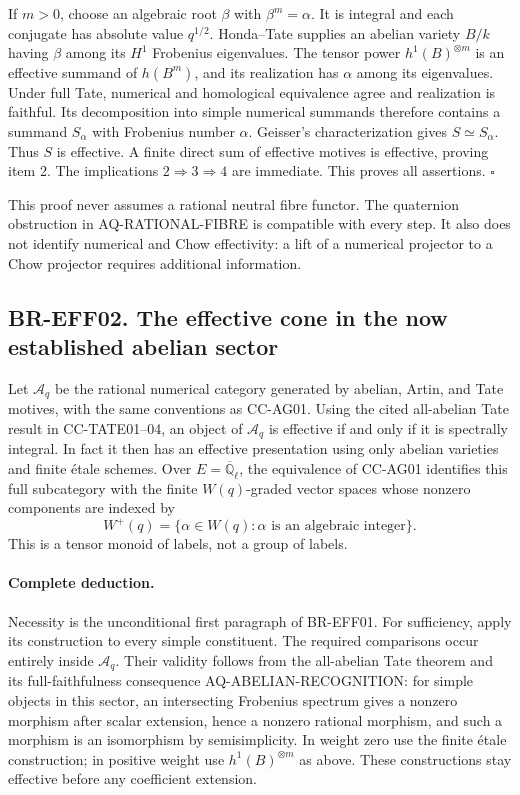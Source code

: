 If $m>0$, choose an algebraic root $\beta$ with $\beta^m=\alpha$.
It is integral and each conjugate has absolute value $q^{1/2}$.
Honda--Tate supplies an abelian variety $B/k$ having $\beta$ among
its $H^1$ Frobenius eigenvalues.  The tensor power
$h^1(B)^{\otimes m}$ is an effective summand of $h(B^m)$, and its
realization has $\alpha$ among its eigenvalues.  Under full Tate,
numerical and homological equivalence agree and realization is
faithful.  Its decomposition into simple numerical summands
therefore contains a summand $S_\alpha$ with Frobenius number
$\alpha$.  Geisser's characterization gives $S\simeq S_\alpha$.
Thus $S$ is effective.  A finite direct sum of effective motives
is effective, proving item 2.  The implications $2\Rightarrow3
\Rightarrow4$ are immediate.  This proves all assertions.
\(\square\)

This proof never assumes a rational neutral fibre functor.
The quaternion obstruction in AQ-RATIONAL-FIBRE is compatible
with every step.  It also does not identify numerical and Chow
effectivity: a lift of a numerical projector to a Chow projector
requires additional information.

\subsection{BR-EFF02. The effective cone in the now established abelian sector}
Let $\mathcal A_q$ be the rational numerical category generated by
abelian, Artin, and Tate motives, with the same conventions as
CC-AG01.  Using the cited all-abelian Tate result in CC-TATE01--04,
an object of $\mathcal A_q$ is effective if and only if it is
spectrally integral.  In fact it then has an effective presentation
using only abelian varieties and finite \'etale schemes.  Over
$E=\overline{\mathbb Q}_\ell$, the equivalence of CC-AG01 identifies
this full subcategory with the finite $W(q)$-graded vector spaces
whose nonzero components are indexed by
\[
 W^+(q)=\{\alpha\in W(q):\alpha\text{ is an algebraic integer}\}.
 \tag{EFF.1}
\]
This is a tensor monoid of labels, not a group of labels.

\paragraph{Complete deduction.}
Necessity is the unconditional first paragraph of BR-EFF01.
For sufficiency, apply its construction to every simple constituent.
The required comparisons occur entirely inside $\mathcal A_q$.
Their validity follows from the all-abelian Tate theorem and its
full-faithfulness consequence AQ-ABELIAN-RECOGNITION: for simple
objects in this sector, an intersecting Frobenius spectrum gives a
nonzero morphism after scalar extension, hence a nonzero rational
morphism, and such a morphism is an isomorphism by semisimplicity.
In weight zero use the finite \'etale construction; in positive
weight use $h^1(B)^{\otimes m}$ as above.  These constructions
stay effective before any coefficient extension.

